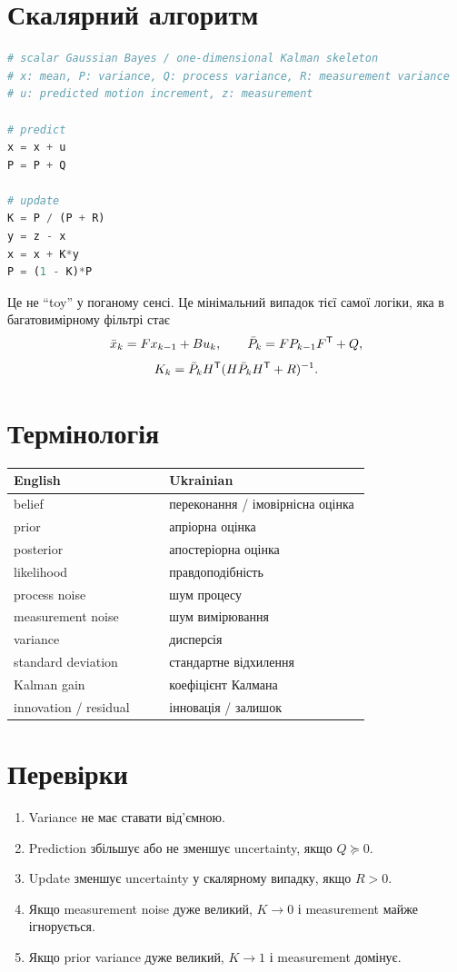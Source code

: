 \section{Скалярний алгоритм}

\begin{lstlisting}[language=Python]
# scalar Gaussian Bayes / one-dimensional Kalman skeleton
# x: mean, P: variance, Q: process variance, R: measurement variance
# u: predicted motion increment, z: measurement

# predict
x = x + u
P = P + Q

# update
K = P / (P + R)
y = z - x
x = x + K*y
P = (1 - K)*P
\end{lstlisting}

Це не ``toy'' у поганому сенсі. Це мінімальний випадок тієї самої логіки, яка в багатовимірному фільтрі стає
\[
  \bar x_k = F x_{k-1}+B u_k,
  \qquad
  \bar P_k = F P_{k-1}F^{\mathsf{T}} + Q,
\]
\[
  K_k = \bar P_k H^{\mathsf{T}}(H\bar P_k H^{\mathsf{T}}+R)^{-1}.
\]

\section{Термінологія}

\begin{longtable}{L{0.34\linewidth}L{0.44\linewidth}}
\toprule
English & Ukrainian \\
\midrule
belief & переконання / імовірнісна оцінка \\
prior & апріорна оцінка \\
posterior & апостеріорна оцінка \\
likelihood & правдоподібність \\
process noise & шум процесу \\
measurement noise & шум вимірювання \\
variance & дисперсія \\
standard deviation & стандартне відхилення \\
Kalman gain & коефіцієнт Калмана \\
innovation / residual & інновація / залишок \\
\bottomrule
\end{longtable}

\section{Перевірки}

\begin{enumerate}[label=\arabic*.]
\item Variance не має ставати від'ємною.
\item Prediction збільшує або не зменшує uncertainty, якщо $Q\succeq0$.
\item Update зменшує uncertainty у скалярному випадку, якщо $R>0$.
\item Якщо measurement noise дуже великий, $K\to0$ і measurement майже ігнорується.
\item Якщо prior variance дуже великий, $K\to1$ і measurement домінує.
\end{enumerate}
